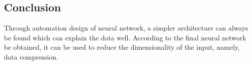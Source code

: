\documentclass[smallextended]{svjour3}       %
\begin{document}
\begin{multicols}{2}

\section{Conclusion}
Through automation design of neural network, a simpler architecture can always
be found which can explain the data well. According to the final neural network
be obtained, it can be used to reduce the dimensionality of the input, namely,
data compression. 


%

\end{multicols}
\end{document}
